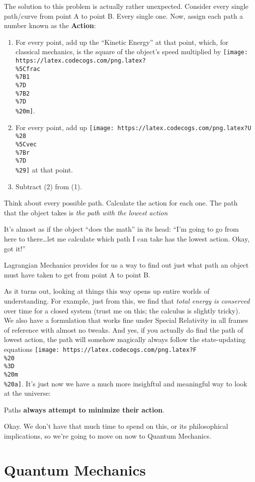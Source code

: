 \documentclass[]{article}
\begin{document}
The solution to this problem is actually rather unexpected. Consider every
single path/curve from point A to point B. Every single one. Now, assign each
path a number known as the \textbf{Action}:

\begin{enumerate}
\def\labelenumi{\arabic{enumi}.}
\tightlist
\item
  For every point, add up the ``Kinetic Energy'' at that point, which, for
  classical mechanics, is the square of the object's speed multiplied by
  \texttt{[image: https://latex.codecogs.com/png.latex?\\\%5Cfrac\\\%7B1\\\%7D\\\%7B2\\\%7D\\\%20m]}.
\item
  For every point, add up
  \texttt{[image: https://latex.codecogs.com/png.latex?U\\\%28\\\%5Cvec\\\%7Br\\\%7D\\\%29]}
  at that point.
\item
  Subtract (2) from (1).
\end{enumerate}

Think about every possible path. Calculate the action for each one. The path
that the object takes is \emph{the path with the lowest action}

It's almost as if the object ``does the math'' in its head: ``I'm going to go
from here to there\ldots{}let me calculate which path I can take has the lowest
action. Okay, got it!''

Lagrangian Mechanics provides for us a way to find out just what path an object
must have taken to get from point A to point B.

As it turns out, looking at things this way opens up entire worlds of
understanding. For example, just from this, we find that \emph{total energy is
conserved} over time for a closed system (trust me on this; the calculus is
slightly tricky). We also have a formulation that works fine under Special
Relativity in all frames of reference with almost no tweaks. And yes, if you
actually do find the path of lowest action, the path will somehow magically
always follow the state-updating equations
\texttt{[image: https://latex.codecogs.com/png.latex?F\\\%20\\\%3D\\\%20m\\\%20a]}. It's
just now we have a much more insighftul and meaningful way to look at the
universe:

Paths \textbf{always attempt to minimize their action}.

Okay. We don't have that much time to spend on this, or its philosophical
implications, so we're going to move on now to Quantum Mechanics.

\hypertarget{quantum-mechanics}{%
\section{Quantum Mechanics}\label{quantum-mechanics}}
\end{document}
